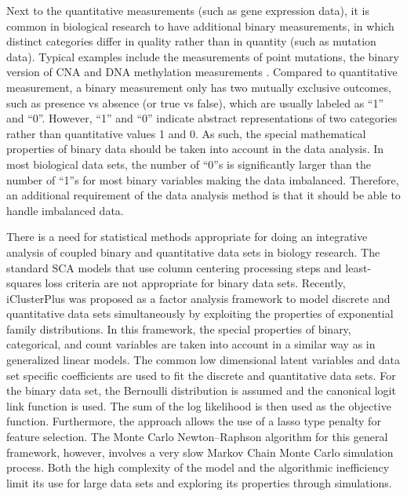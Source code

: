 Next to the quantitative measurements (such as gene expression data), it is common in biological research to have additional binary measurements, in which distinct categories differ in quality rather than in quantity (such as mutation data). Typical examples include the measurements of point mutations, the binary version of CNA and DNA methylation measurements \cite{iorio2016landscape}. Compared to quantitative measurement, a binary measurement only has two mutually exclusive outcomes, such as presence vs absence (or true vs false), which are usually labeled as ``1'' and ``0''. However, ``1'' and ``0'' indicate abstract representations of two categories rather than quantitative values 1 and 0. As such, the special mathematical properties of binary data should be taken into account in the data analysis. In most biological data sets, the number of ``0''s is significantly larger than the number of ``1''s for most binary variables making the data imbalanced. Therefore, an additional requirement of the data analysis method is that it should be able to handle imbalanced data.

There is a need for statistical methods appropriate for doing an integrative analysis of coupled binary and quantitative data sets in biology research. The standard SCA models \cite{van2009structured, van2009integrating} that use column centering processing steps and least-squares loss criteria are not appropriate for binary data sets. Recently, iClusterPlus \cite{mo2013pattern} was proposed as a factor analysis framework to model discrete and quantitative data sets simultaneously by exploiting the properties of exponential family distributions. In this framework, the special properties of binary, categorical, and count variables are taken into account in a similar way as in generalized linear models. The common low dimensional latent variables and data set specific coefficients are used to fit the discrete and quantitative data sets. For the binary data set, the Bernoulli distribution is assumed and the canonical logit link function is used. The sum of the log likelihood is then used as the objective function. Furthermore, the approach allows the use of a lasso type penalty for feature selection. The Monte Carlo Newton–Raphson algorithm for this general framework, however, involves a very slow Markov Chain Monte Carlo simulation process. Both the high complexity of the model and the algorithmic inefficiency limit its use for large data sets and exploring its properties through simulations.

